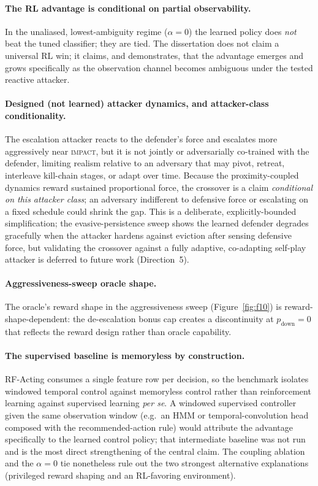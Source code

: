 \paragraph{The RL advantage is conditional on partial observability.} In the unaliased, lowest-ambiguity regime ($\alpha=0$) the learned policy does \emph{not} beat the tuned classifier; they are tied. The dissertation does not claim a universal RL win; it claims, and demonstrates, that the advantage emerges and grows specifically as the observation channel becomes ambiguous under the tested reactive attacker.

\paragraph{Designed (not learned) attacker dynamics, and attacker-class conditionality.} The escalation attacker reacts to the defender's force and escalates more aggressively near \textsc{impact}, but it is not jointly or adversarially co-trained with the defender, limiting realism relative to an adversary that may pivot, retreat, interleave kill-chain stages, or adapt over time. Because the proximity-coupled dynamics reward sustained proportional force, the crossover is a claim \emph{conditional on this attacker class}; an adversary indifferent to defensive force or escalating on a fixed schedule could shrink the gap. This is a deliberate, explicitly-bounded simplification; the evasive-persistence sweep shows the learned defender degrades gracefully when the attacker hardens against eviction after sensing defensive force, but validating the crossover against a fully adaptive, co-adapting self-play attacker is deferred to future work (Direction~5).

\paragraph{Aggressiveness-sweep oracle shape.} The oracle's reward shape in the aggressiveness sweep (Figure~\ref{fig:f10}) is reward-shape-dependent: the de-escalation bonus cap creates a discontinuity at $p_{\mathrm{down}} = 0$ that reflects the reward design rather than oracle capability.

\paragraph{The supervised baseline is memoryless by construction.} RF-Acting consumes a single feature row per decision, so the benchmark isolates windowed temporal control against memoryless control rather than reinforcement learning against supervised learning \emph{per se}. A windowed supervised controller given the same observation window (e.g.\ an HMM or temporal-convolution head composed with the recommended-action rule) would attribute the advantage specifically to the learned control policy; that intermediate baseline was not run and is the most direct strengthening of the central claim. The coupling ablation and the $\alpha=0$ tie nonetheless rule out the two strongest alternative explanations (privileged reward shaping and an RL-favoring environment).

